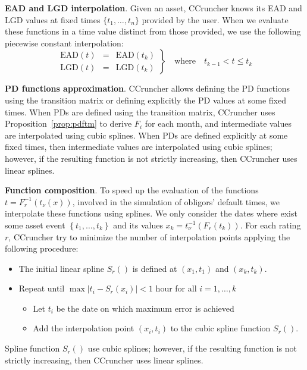 \documentclass[11pt,fleqn]{book} %
\begin{document}
\textbf{EAD and LGD interpolation}. Given an asset, CCruncher knows its EAD 
and LGD values at fixed times $\{t_1,\dots,t_n\}$ provided by the user. When 
we evaluate these functions in a time value distinct from those provided, we 
use the following piecewise constant interpolation:
\begin{displaymath}
  \left.
	\begin{array}{rcl}
		\text{EAD}(t) & = & \text{EAD}(t_k) \\
		\text{LGD}(t) & = & \text{LGD}(t_k)
	\end{array}
	\right\}
	\quad \text{where} \quad t_{k-1} < t \le t_{k}
\end{displaymath}

\textbf{PD functions approximation}. CCruncher allows defining the PD
functions using the transition matrix or defining explicitly the PD values
at some fixed times. When PDs are defined using the transition matrix, 
CCruncher uses Proposition~\ref{prop:pdftm} to derive $F_i$ for each 
month, and intermediate values are interpolated using cubic splines. 
When PDs are defined explicitly at some fixed times, then intermediate 
values are interpolated using cubic splines; however, if the resulting 
function is not strictly increasing, then CCruncher uses linear splines.

\textbf{Function composition}. To speed up the evaluation of the functions 
$t=F_r^{-1}(t_{\nu}(x))$, involved in the simulation of obligors' default 
times, we interpolate these functions using splines. We only consider the 
dates where exist some asset event $\left\{t_1,\dots,t_k\right\}$ and its 
values $x_k=t_{\nu}^{-1}(F_r(t_k))$. For each rating $r$, CCruncher try to 
minimize the number of interpolation points applying the following procedure:
\begin{itemize}
	\item The initial linear spline $S_r()$ is defined at $(x_1,t_1)$ and $(x_k,t_k)$.
	\item Repeat until $\displaystyle \max\left|t_i - S_r(x_i)\right| < 1$ hour for all $i=1,\dots,k$
	\begin{itemize}
		\item Let $t_i$ be the date on which maximum error is achieved
		\item Add the interpolation point $(x_i,t_i)$ to the cubic spline function $S_r()$.
	\end{itemize}
\end{itemize}
Spline function $S_r()$ use cubic splines; however, if the resulting function 
is not strictly increasing, then CCruncher uses linear splines.
\end{document}
